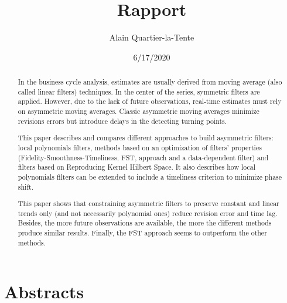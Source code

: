 \documentclass[
  12pt,
  ,
  a4paper]{article}
\title{Rapport}
\author{Alain Quartier-la-Tente}
\date{6/17/2020}
\newcommand\1{\mathds{1}}
\begin{document}
\maketitle

{
\hypersetup{linkcolor=}
\setcounter{tocdepth}{3}
\tableofcontents
}
\newpage

\hypertarget{abstracts}{%
\section*{Abstracts}\label{abstracts}}

\begin{abstract}

In the business cycle analysis, estimates are usually derived from moving average (also called linear filters) techniques.
In the center of the series, symmetric filters are applied.
However, due to the lack of future observations, real-time estimates must rely on asymmetric moving averages.
Classic asymmetric moving averages minimize revisions errors but introduce delays in the detecting turning points.

This paper describes and compares different approaches to build asymmetric filters: local polynomials filters, methods based on an optimization of filters' properties (Fidelity-Smoothness-Timeliness, FST, approach and a data-dependent filter) and filters based on Reproducing Kernel Hilbert Space.
It also describes how local polynomials filters can be extended to include a timeliness criterion to minimize phase shift.

This paper shows that constraining asymmetric filters to preserve constant and linear trends only (and not necessarily polynomial ones) reduce revision error and time lag.
Besides, the more future observations are available, the more the different methods produce similar results.
Finally, the FST approach seems to outperform the other methods.

\end{abstract}

\renewcommand{\abstractname}{Résumé}
\end{document}
